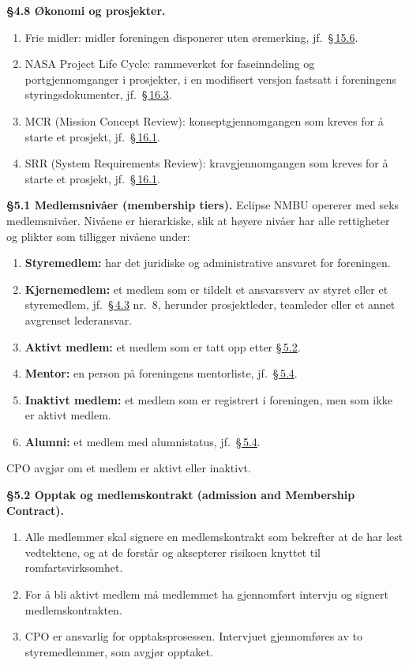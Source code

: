 \documentclass{../../../Common/Latex/Templates/rapport}
\begin{document}
\textbf{\S 4.8 Økonomi og prosjekter.}\label{nbylaw:4.8}
\begin{enumerate}
  \item Frie midler: midler foreningen disponerer uten øremerking, jf.\ \hyperref[nbylaw:15.6]{\S\,15.6}.
  \item NASA Project Life Cycle: rammeverket for faseinndeling og portgjennomganger i prosjekter, i en modifisert versjon fastsatt i foreningens styringsdokumenter, jf.\ \hyperref[nbylaw:16.3]{\S\,16.3}.
  \item MCR (Mission Concept Review): konseptgjennomgangen som kreves for \r{a} starte et prosjekt, jf.\ \hyperref[nbylaw:16.1]{\S\,16.1}.
  \item SRR (System Requirements Review): kravgjennomgangen som kreves for \r{a} starte et prosjekt, jf.\ \hyperref[nbylaw:16.1]{\S\,16.1}.
\end{enumerate}


\label{nbylaw:5}
\textbf{\S 5.1 Medlemsniv\r{a}er (membership tiers).}\label{nbylaw:5.1} Eclipse NMBU opererer med seks medlemsniv\r{a}er. Niv\r{a}ene er hierarkiske, slik at høyere niv\r{a}er har alle rettigheter og plikter som tilligger niv\r{a}ene under:
\begin{enumerate}
  \item \textbf{Styremedlem:} har det juridiske og administrative ansvaret for foreningen.
  \item \textbf{Kjernemedlem:} et medlem som er tildelt et ansvarsverv av styret eller et styremedlem, jf.\ \hyperref[nbylaw:4.3]{\S\,4.3} nr.\ 8, herunder prosjektleder, teamleder eller et annet avgrenset lederansvar.
  \item \textbf{Aktivt medlem:} et medlem som er tatt opp etter \hyperref[nbylaw:5.2]{\S\,5.2}.
  \item \textbf{Mentor:} en person p\r{a} foreningens mentorliste, jf.\ \hyperref[nbylaw:5.4]{\S\,5.4}.
  \item \textbf{Inaktivt medlem:} et medlem som er registrert i foreningen, men som ikke er aktivt medlem.
  \item \textbf{Alumni:} et medlem med alumnistatus, jf.\ \hyperref[nbylaw:5.4]{\S\,5.4}.
\end{enumerate}
CPO avgjør om et medlem er aktivt eller inaktivt.

\textbf{\S 5.2 Opptak og medlemskontrakt (admission and Membership Contract).}\label{nbylaw:5.2}
\begin{enumerate}
  \item Alle medlemmer skal signere en medlemskontrakt som bekrefter at de har lest vedtektene, og at de forst\r{a}r og aksepterer risikoen knyttet til romfartsvirksomhet.
  \item For \r{a} bli aktivt medlem m\r{a} medlemmet ha gjennomført intervju og signert medlemskontrakten.
  \item CPO er ansvarlig for opptaksprosessen. Intervjuet gjennomføres av to styremedlemmer, som avgjør opptaket.
\end{enumerate}
\end{document}
